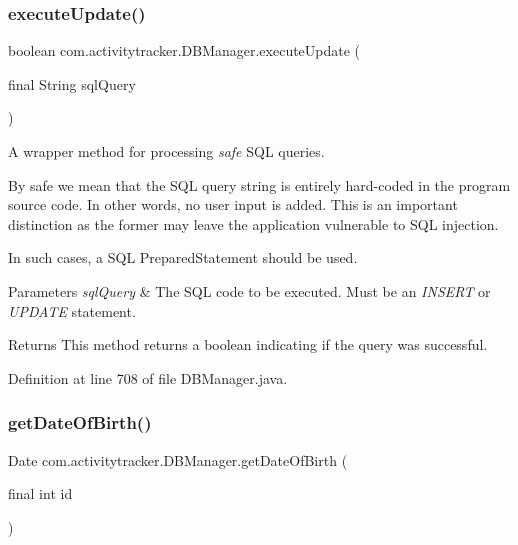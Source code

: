 \subsubsection{\texorpdfstring{execute\+Update()}{executeUpdate()}}
{\footnotesize\ttfamily boolean com.\+activitytracker.\+D\+B\+Manager.\+execute\+Update (\begin{DoxyParamCaption}\item[{final String}]{sql\+Query }\end{DoxyParamCaption})\hspace{0.3cm}{\ttfamily [private]}}

A wrapper method for processing {\itshape safe} S\+QL queries.

By safe we mean that the S\+QL query string is entirely hard-\/coded in the program source code. In other words, no user input is added. This is an important distinction as the former may leave the application vulnerable to S\+QL injection.

In such cases, a S\+QL Prepared\+Statement should be used.


\begin{DoxyParams}{Parameters}
{\em sql\+Query} & The S\+QL code to be executed. Must be an {\itshape I\+N\+S\+E\+RT} or {\itshape U\+P\+D\+A\+TE} statement.\\
\hline
\end{DoxyParams}
\begin{DoxyReturn}{Returns}
This method returns a boolean indicating if the query was successful. 
\end{DoxyReturn}


Definition at line 708 of file D\+B\+Manager.\+java.

\mbox{\label{classcom_1_1activitytracker_1_1_d_b_manager_a0576baf67b45c7d2d0ba369052e4404e}} 
\subsubsection{\texorpdfstring{get\+Date\+Of\+Birth()}{getDateOfBirth()}}
{\footnotesize\ttfamily Date com.\+activitytracker.\+D\+B\+Manager.\+get\+Date\+Of\+Birth (\begin{DoxyParamCaption}\item[{final int}]{id }\end{DoxyParamCaption})}

